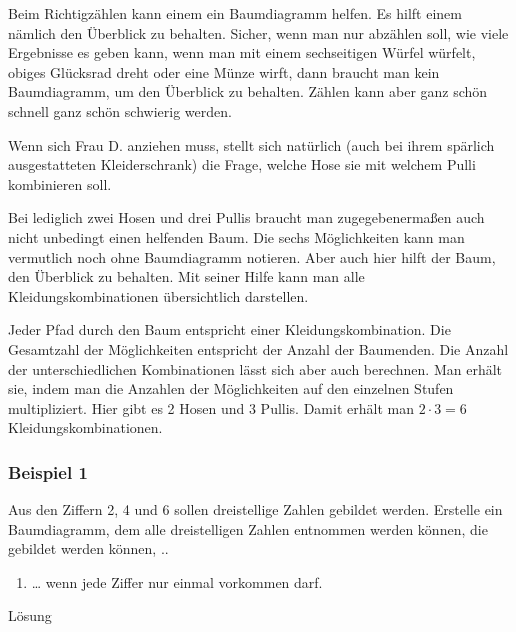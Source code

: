 \documentclass[
  ngerman,
]{book}
\providecommand{\tightlist}{%
  \setlength{\itemsep}{0pt}\setlength{\parskip}{0pt}}
\begin{document}
Beim Richtigzählen kann einem ein Baumdiagramm helfen. Es hilft einem nämlich den Überblick zu behalten. Sicher, wenn man nur abzählen soll, wie viele Ergebnisse es geben kann, wenn man mit einem sechseitigen Würfel würfelt, obiges Glücksrad dreht oder eine Münze wirft, dann braucht man kein Baumdiagramm, um den Überblick zu behalten. Zählen kann aber ganz schön schnell ganz schön schwierig werden.

Wenn sich Frau D. anziehen muss, stellt sich natürlich (auch bei ihrem spärlich ausgestatteten Kleiderschrank) die Frage, welche Hose sie mit welchem Pulli kombinieren soll.

Bei lediglich zwei Hosen und drei Pullis braucht man zugegebenermaßen auch nicht unbedingt einen helfenden Baum. Die sechs Möglichkeiten kann man vermutlich noch ohne Baumdiagramm notieren. Aber auch hier hilft der Baum, den Überblick zu behalten. Mit seiner Hilfe kann man alle Kleidungskombinationen übersichtlich darstellen.

Jeder Pfad durch den Baum entspricht einer Kleidungskombination. Die Gesamtzahl der Möglichkeiten entspricht der Anzahl der Baumenden. Die Anzahl der unterschiedlichen Kombinationen lässt sich aber auch berechnen. Man erhält sie, indem man die Anzahlen der Möglichkeiten auf den einzelnen Stufen multipliziert. Hier gibt es 2 Hosen und 3 Pullis. Damit erhält man \(2 \cdot 3 = 6\) Kleidungskombinationen.

\hypertarget{beispiel-1}{%
\subsubsection*{Beispiel 1}\label{beispiel-1}}

Aus den Ziffern 2, 4 und 6 sollen dreistellige Zahlen gebildet werden. Erstelle ein Baumdiagramm, dem alle dreistelligen Zahlen entnommen werden können, die gebildet werden können, ..

\begin{enumerate}
\def\labelenumi{\alph{enumi})}
\tightlist
\item
  \ldots{} wenn jede Ziffer nur einmal vorkommen darf.
\end{enumerate}

Lösung

\hypertarget{section-102}{%
\subsubsection*{}\label{section-102}}
\end{document}

